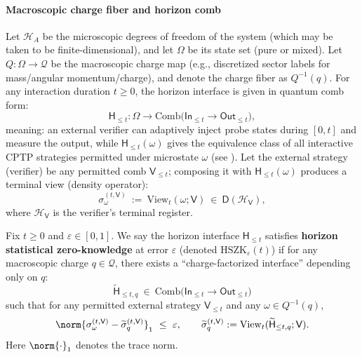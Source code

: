 \paragraph{Macroscopic charge fiber and horizon comb}
Let \(\mathcal{H}_A\) be the microscopic degrees of freedom of the system (which may be taken to be finite-dimensional), and let \(\Omega\) be its state set (pure or mixed).
Let \(Q:\Omega\to\mathcal{Q}\) be the macroscopic charge map (e.g., discretized sector labels for mass/angular momentum/charge), and denote the charge fiber as \(Q^{-1}(q)\).
For any interaction duration \(t\ge 0\), the horizon interface is given in quantum comb form:
\[
\mathsf{H}_{\le t}:\Omega\to \mathrm{Comb}\bigl(\mathsf{In}_{\le t}\to \mathsf{Out}_{\le t}\bigr),
\]
meaning: an external verifier can adaptively inject probe states during \([0,t]\) and measure the output, while \(\mathsf{H}_{\le t}(\omega)\) gives the equivalence class of all interactive CPTP strategies permitted under microstate \(\omega\) (see \cite{ChiribellaDArianoPerinotti2008QuantumCircuitArchitecture,ChiribellaDArianoPerinotti2009FrameworkQuantumNetworks}).
Let the external strategy (verifier) be any permitted comb \(\mathsf{V}_{\le t}\); composing it with \(\mathsf{H}_{\le t}(\omega)\) produces a terminal view (density operator):
\[
\sigma^{(t,\mathsf{V})}_\omega\ :=\ \mathrm{View}_t(\omega;\mathsf{V})\ \in\ \mathsf{D}(\mathcal{H}_{\mathsf{V}}),
\]
where \(\mathcal{H}_{\mathsf{V}}\) is the verifier's terminal register.
\par

\begin{definition}\label{def:discussion-hszk}
Fix \(t\ge 0\) and \(\varepsilon\in[0,1]\).
We say the horizon interface \(\mathsf{H}_{\le t}\) satisfies \textbf{horizon statistical zero-knowledge} at error \(\varepsilon\) (denoted \(\mathrm{HSZK}_\varepsilon(t)\)) if for any macroscopic charge \(q\in\mathcal{Q}\), there exists a ``charge-factorized interface'' depending only on \(q\):
\[
\widetilde{\mathsf{H}}_{\le t,q}\ \in\ \mathrm{Comb}\bigl(\mathsf{In}_{\le t}\to \mathsf{Out}_{\le t}\bigr)
\]
such that for any permitted external strategy \(\mathsf{V}_{\le t}\) and any \(\omega\in Q^{-1}(q)\),
\begin{equation}\label{eq:discussion-hszk-view-trace}
\norm{\sigma^{(t,\mathsf{V})}_\omega-\widetilde{\sigma}^{(t,\mathsf{V})}_q}_1\ \le\ \varepsilon,
\qquad
\widetilde{\sigma}^{(t,\mathsf{V})}_q:=\mathrm{View}_t(\widetilde{\mathsf{H}}_{\le t,q};\mathsf{V}).
\end{equation}
Here \(\norm{\cdot}_1\) denotes the trace norm.
\end{definition}

